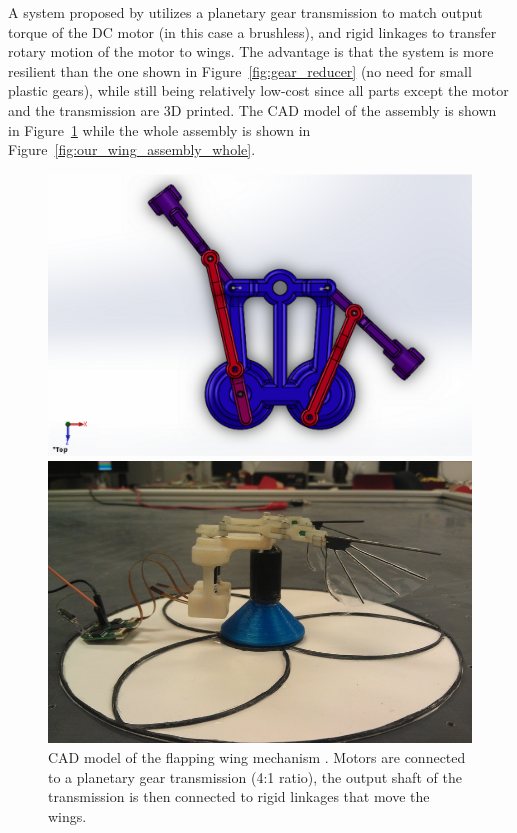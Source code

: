 A system proposed by \cite{gallagher} utilizes a planetary gear transmission to match output torque of the DC motor (in this case a brushless), and rigid linkages to transfer rotary motion of the motor to wings. The advantage is that the system is more resilient than the one shown in Figure~\ref{fig:gear_reducer} (no need for small plastic gears), while still being relatively low-cost since all parts except the motor and the transmission are 3D printed. The CAD model of the assembly is shown in Figure~\ref{fig:our_wing_assembly_cad} while the whole assembly is shown in Figure~\ref{fig:our_wing_assembly_whole}.

\begin{figure}
\centering
{}
\includegraphics[width=\textwidth]{Files/Figures/cad_assembly.png}
\caption[Planetary gear transmission with solid linkages]{CAD model of the flapping wing mechanism \cite{cpsgroup}. Motors are connected to a planetary gear transmission (4:1 ratio), the output shaft of the transmission is then connected to rigid linkages that move the wings.}
\label{fig:our_wing_assembly_cad}
\endminipage\hfill
{}
\includegraphics[width=\textwidth]{Files/Figures/sideview_vehicle_4x6.jpg}

\end{figure}
